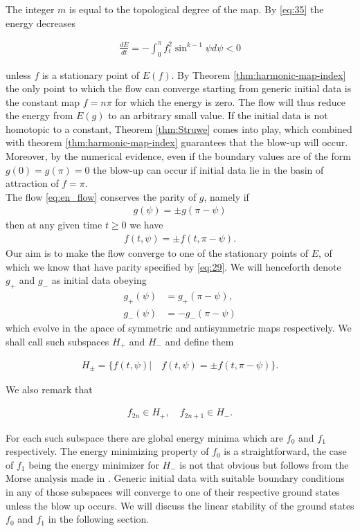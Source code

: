 The integer $m$ is equal to the topological degree of the map.  By
\eqref{eq:35} the energy decreases

\begin{align}
  \label{eq:36}
  \frac{dE}{dt}=-\int_0^{\pi}f_t^2\sin^{k-1}\psi d\psi<0
\end{align}

unless $f$ is a stationary point of $E(f)$. By Theorem
\ref{thm:harmonic-map-index} the only point to which the flow can
converge starting from generic initial data is the constant map
$f=n\pi$ for which the energy is zero. The flow will thus reduce the
energy from $E(g)$ to an arbitrary small value. If the initial data is
not homotopic to a constant, Theorem \ref{thm:Struwe} comes into play,
which combined with theorem \ref{thm:harmonic-map-index} guarantees
that the blow-up will occur. Moreover, by the numerical evidence, even
if the boundary values are of the form $g(0)=g(\pi)=0$ the blow-up can
occur if initial data lie in the basin of attraction of $f=\pi$.\\

The flow \eqref{eq:en_flow} conserves the parity of $g$, namely if
\begin{align}
  \label{eq:37}
  g(\psi)=\pm g(\pi-\psi)
\end{align}
then at any given time $t\ge0$ we have
\begin{align}\label{eq:38}
  f(t,\psi)=\pm f(t,\pi-\psi).
\end{align}
Our aim is to make the flow converge to one of the stationary points
of $E$, of which we know that have parity specified by
\eqref{eq:29}. We will henceforth denote $g_+$ and $g_-$ as initial
data obeying
\begin{align}
  \label{eq:39}
  g_+(\psi)&=g_+(\pi-\psi),\\
  g_-(\psi)&=-g_-(\pi-\psi)
\end{align}
which evolve in the apace of symmetric and antisymmetric maps
respectively. We shall call such subspaces $H_+$ and $H_-$ and define
them

\begin{align}
  \label{eq:40}
  H_\pm=\{f(t,\psi)|\quad f(t,\psi)=\pm f(t,\pi-\psi)\}.
\end{align}

We also remark that

\begin{align}
  \label{eq:41}
  f_{2n}\in H_+,\quad f_{2n+1}\in H_-.
\end{align}

For each such subspace there are global energy minima which are $f_0$
and $f_1$ respectively. The energy minimizing property of $f_0$ is a
straightforward, the case of $f_1$ being the energy minimizer for
$H_-$ is not that obvious but follows from the Morse analysis made in
\cite{Corlette2001}. Generic initial data with suitable boundary
conditions in any of those subspaces will converge to one of their
respective ground states unless the blow up occurs. We will discuss
the linear stability of the ground states $f_0$ and $f_1$ in the
following section.

